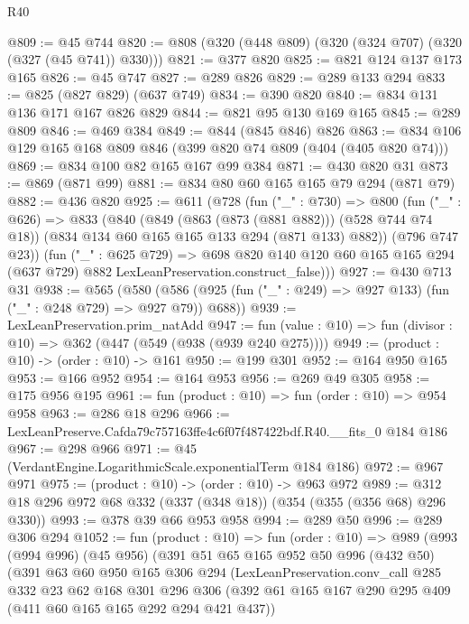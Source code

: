 \begin{lexlean}{R40}
\begin{coremodule}
@809 := @45 @744
@820 := @808 (@320 (@448 @809) (@320 (@324 @707) (@320 (@327 (@45 @741)) @330)))
@821 := @377 @820
@825 := @821 @124 @137 @173 @165
@826 := @45 @747
@827 := @289 @826
@829 := @289 @133 @294
@833 := @825 (@827 @829) (@637 @749)
@834 := @390 @820
@840 := @834 @131 @136 @171 @167 @826 @829
@844 := @821 @95 @130 @169 @165
@845 := @289 @809
@846 := @469 @384
@849 := @844 (@845 @846) @826
@863 := @834 @106 @129 @165 @168 @809 @846 (@399 @820 @74 @809 (@404 (@405 @820 @74)))
@869 := @834 @100 @82 @165 @167 @99 @384
@871 := @430 @820 @31
@873 := @869 (@871 @99)
@881 := @834 @80 @60 @165 @165 @79 @294 (@871 @79)
@882 := @436 @820
@925 := @611
    (@728
      (fun ("_" : @730) =>
      @800
        (fun ("_" : @626) =>
        @833
          (@840
            (@849 (@863 (@873 (@881 @882))) (@528 @744 @74 @18))
            (@834 @134 @60 @165 @165 @133 @294 (@871 @133) @882))
          (@796 @747 @23))
        (fun ("_" : @625 @729) =>
        @698
          @820
          @140
          @120
          @60
          @165
          @165
          @294
          (@637 @729)
          @882
          LexLeanPreservation.construct_false)))
@927 := @430 @713 @31
@938 := @565
    (@580 (@586 (@925 (fun ("_" : @249) => @927 @133) (fun ("_" : @248 @729) => @927 @79)) @688))
@939 := LexLeanPreservation.prim_natAdd
@947 := fun (value : @10) => fun (divisor : @10) => @362 (@447 (@549 (@938 (@939 @240 @275))))
@949 := (product : @10) -> (order : @10) -> @161
@950 := @199 @301
@952 := @164 @950 @165
@953 := @166 @952
@954 := @164 @953
@956 := @269 @49 @305
@958 := @175 @956 @195
@961 := fun (product : @10) => fun (order : @10) => @954 @958
@963 := @286 @18 @296
@966 := LexLeanPreserve.Cafda79c757163ffe4c6f07f487422bdf.R40.__fits_0 @184 @186
@967 := @298 @966
@971 := @45 (VerdantEngine.LogarithmicScale.exponentialTerm @184 @186)
@972 := @967 @971
@975 := (product : @10) -> (order : @10) -> @963 @972
@989 := @312 @18 @296 @972 @68 @332 (@337 (@348 @18)) (@354 (@355 (@356 @68) @296 @330))
@993 := @378 @39 @66 @953 @958
@994 := @289 @50
@996 := @289 @306 @294
@1052 := fun (product : @10) =>
  fun (order : @10) =>
  @989
    (@993
      (@994 @996)
      (@45 @956)
      (@391
        @51
        @65
        @165
        @952
        @50
        @996
        (@432 @50)
        (@391
          @63
          @60
          @950
          @165
          @306
          @294
          (LexLeanPreservation.conv_call
            @285
            @332
            @23
            @62
            @168
            @301
            @296
            @306
            (@392 @61 @165 @167 @290 @295 @409 (@411 @60 @165 @165 @292 @294 @421 @437))

\end{coremodule}
\end{lexlean}
